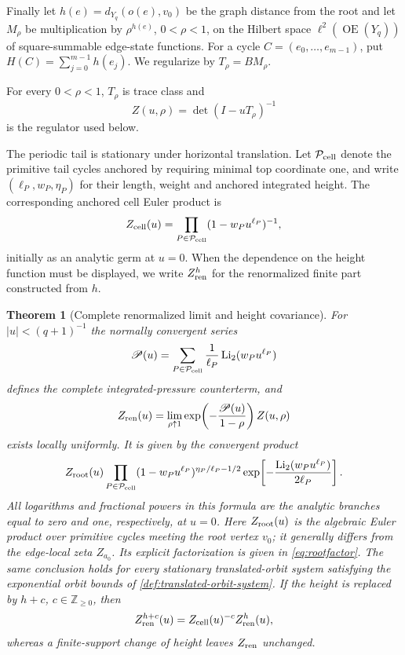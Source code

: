 \documentclass[11pt,reqno]{amsart}
\numberwithin{equation}{section}
\newtheorem{theorem}{Theorem}[section]
\theoremstyle{definition}
\theoremstyle{remark}
\newcommand{\OrE}{\operatorname{OE}}
\newcommand{\Li}{\operatorname{Li}_2}
\begin{document}
Finally let $h(e)=d_{Y_q}(o(e),v_0)$ be the graph distance from the root and
let $M_\rho$ be multiplication by $\rho^{h(e)}$, $0<\rho<1$, on the Hilbert
space $\ell^2(\OrE(Y_q))$ of square-summable edge-state functions.  For a
cycle $C=(e_0,\ldots,e_{m-1})$, put
$H(C)=\sum_{j=0}^{m-1}h(e_j)$.  We regularize by $T_\rho=BM_\rho$.

For every $0<\rho<1$, $T_\rho$ is trace class and
\[
 Z(u,\rho)=\det(I-uT_\rho)^{-1}
\]
is the regulator used below.

The periodic tail is stationary under horizontal translation.  Let
$\mathcal P_{\rm cell}$ denote the primitive tail cycles anchored by requiring
minimal top coordinate one, and write $(\ell_P,w_P,\eta_P)$ for their length,
weight and anchored integrated height.
The corresponding anchored cell Euler product is
\[
 Z_{\rm cell}(u)
 =\prod_{P\in\mathcal P_{\rm cell}}(1-w_Pu^{\ell_P})^{-1},
\]
initially as an analytic germ at $u=0$.  When the dependence on the height
function must be displayed, we write $Z_{\rm ren}^{h}$ for the renormalized
finite part constructed from $h$.

\begin{theorem}[Complete renormalized limit and height covariance]
\label{thm:intro-renormalized}
For $|u|<(q+1)^{-1}$ the normally convergent
series
\[
 \mathscr P(u)=\sum_{P\in\mathcal P_{\rm cell}}
 \frac1{\ell_P}\Li(w_Pu^{\ell_P})
\]
defines the complete integrated-pressure counterterm, and
\[
 Z_{\rm ren}(u)=\lim_{\rho\uparrow1}
 \exp\!\left(-\frac{\mathscr P(u)}{1-\rho}\right)Z(u,\rho)
\]
exists locally uniformly.  It is given by the convergent product
\[
 Z_{\rm root}(u)
 \prod_{P\in\mathcal P_{\rm cell}}
 (1-w_Pu^{\ell_P})^{\eta_P/\ell_P-1/2}
 \exp\!\left[-\frac{\Li(w_Pu^{\ell_P})}{2\ell_P}\right].
\]
All logarithms and fractional powers in this formula are the analytic branches
equal to zero and one, respectively, at $u=0$.
Here $Z_{\rm root}(u)$ is the algebraic Euler product over primitive cycles
meeting the root vertex $v_0$; it generally differs from the edge-local zeta
$Z_{a_0}$.  Its explicit factorization is given in
\eqref{eq:rootfactor}.  The same conclusion holds for every stationary
translated-orbit system satisfying the exponential orbit bounds of
\cref{def:translated-orbit-system}.  If the height is replaced by $h+c$,
$c\in\mathbb Z_{\ge0}$, then
\[
 Z_{\rm ren}^{h+c}(u)=Z_{\rm cell}(u)^{-c}Z_{\rm ren}^{h}(u),
\]
whereas a finite-support change of height leaves $Z_{\rm ren}$ unchanged.
\end{theorem}
\end{document}
